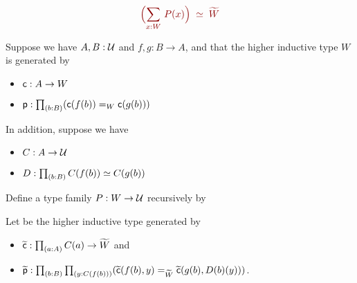 \documentclass[centering]{report}
\newenvironment{slide}
    {\newpage
    \vspace*{\fill}
    }
    {
     \vspace*{\fill}
    }
\begin{document}
\begin{slide}
\begin{lem}
\label{thm:flattening-lem}
\begin{align*}
  \color{darkred}
  \eqvspaced{\Parens{\sm{x:W} P(x)}}{\widetilde{W}}
\end{align*}

Suppose we have $A,B:\mathcal{U}$ and $f,g:B\to{}A$, and that
the higher inductive type $W$ is generated by

\begin{itemize}
\item $\mathsf{c}:A\to{}W$ %
\item $\pp:\prd{b:B} (\cc(f(b))=_W\cc(g(b)))$
\end{itemize}
In addition, suppose we have
\begin{itemize}
\item $C:A\to\mathcal{U}$ %
\item $D:\prd{b:B}\eqv{C(f(b))}{C(g(b))}$ %
\end{itemize}
Define a type family $P : W\to\mathcal{U}$ recursively by
Let \Wtil be the higher inductive type generated by
\begin{itemize}
\item $\cct:\prd{a:A} C(a) \to \Wtil$ and
\item $\ppt:\prd{b:B}{y:C(f(b))} (\cct(f(b),y)=_{\Wtil}\cct(g(b),D(b)(y)))$.
\end{itemize}
\end{lem}
\end{slide}
\end{document}
